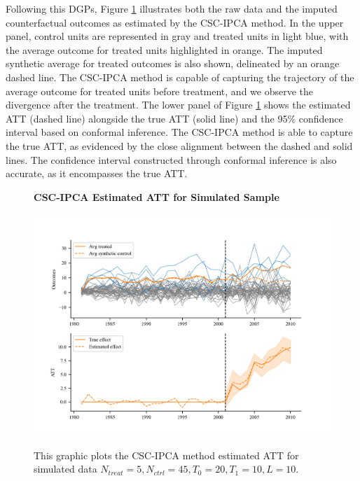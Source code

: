 \documentclass[12pt]{article}
\begin{document}
Following this DGPs, Figure \ref{fig: est} illustrates both the raw data and the imputed counterfactual outcomes as estimated by the CSC-IPCA method. In the upper panel, control units are represented in gray and treated units in light blue, with the average outcome for treated units highlighted in orange. The imputed synthetic average for treated outcomes is also shown, delineated by an orange dashed line. The CSC-IPCA method is capable of capturing the trajectory of the average outcome for treated units before treatment, and we observe the divergence after the treatment. The lower panel of Figure \ref{fig: est} shows the estimated ATT (dashed line) alongside the true ATT (solid line) and the 95\% confidence interval based on conformal inference. The CSC-IPCA method is able to capture the true ATT, as evidenced by the close alignment between the dashed and solid lines. The confidence interval constructed through conformal inference is also accurate, as it encompasses the true ATT.

\begin{figure}[!ht]
    \centering
    \caption{\textbf{CSC-IPCA Estimated ATT for Simulated Sample}}
    \includegraphics{figs/estimation.png}
    \label{fig: est}
    \caption*{\footnotesize{This graphic plots the CSC-IPCA method estimated ATT for simulated data $N_{treat} = 5, N_{ctrl} = 45, T_0=20, T_1=10, L=10$.}}
\end{figure}
\end{document}
